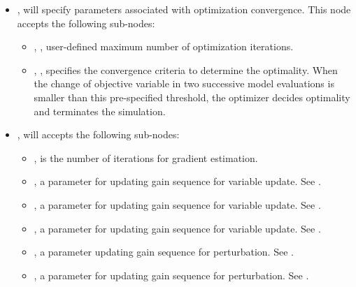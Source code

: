 \begin{itemize}
\item {},  will specify parameters associated with optimization convergence. This node accepts the following sub-nodes:
  \begin{itemize}
  \item {}, , user-defined maximum number of optimization iterations.
  \item {}, , specifies the convergence criteria to determine the optimality. When the change of objective variable in two successive model evaluations is smaller than this pre-specified threshold, the  optimizer decides optimality and terminates the simulation.
  \end{itemize}
\item {},  will accepts the following sub-nodes:
  \begin{itemize}
  \item {},  is the number of iterations for gradient estimation.
  \item {},  a parameter for updating gain sequence for variable update. See \cite{spall1998implementation}.
  \item {},  a parameter for updating gain sequence for variable update. See \cite{spall1998implementation}.
  \item {},  a parameter for updating gain sequence for variable update. See \cite{spall1998implementation}.
  \item {},  a parameter updating gain sequence for perturbation. See \cite{spall1998implementation}.
  \item {},  a parameter for updating gain sequence for perturbation. See \cite{spall1998implementation}.
  \end{itemize}
\end{itemize}


